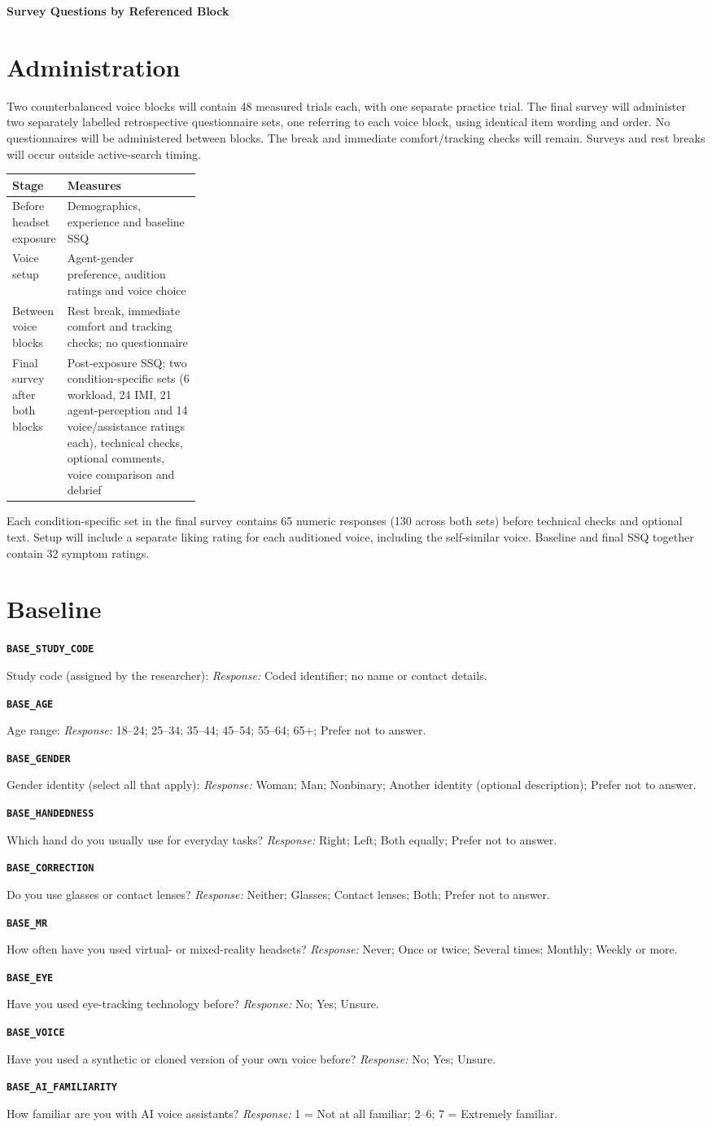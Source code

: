 \documentclass[11pt,letterpaper]{article}
\newcommand{\qid}[1]{\par\smallskip\textbf{\texttt{#1}}\par}
\begin{document}
{\LARGE\bfseries Survey Questions by Referenced Block}\par
\section{Administration}
Two counterbalanced voice blocks will contain 48 measured trials each, with one separate practice trial. The final survey will administer two separately labelled retrospective questionnaire sets, one referring to each voice block, using identical item wording and order. No questionnaires will be administered between blocks. The break and immediate comfort/tracking checks will remain. Surveys and rest breaks will occur outside active-search timing.

\begin{tabularx}{\linewidth}{@{}p{0.27\linewidth}X@{}}\toprule
Stage & Measures \\\midrule
Before headset exposure & Demographics, experience and baseline SSQ \\
Voice setup & Agent-gender preference, audition ratings and voice choice \\
Between voice blocks & Rest break, immediate comfort and tracking checks; no questionnaire \\
Final survey after both blocks & Post-exposure SSQ; two condition-specific sets (6 workload, 24 IMI, 21 agent-perception and 14 voice/assistance ratings each), technical checks, optional comments, voice comparison and debrief \\\bottomrule
\end{tabularx}
Each condition-specific set in the final survey contains 65 numeric responses (130 across both sets) before technical checks and optional text. Setup will include a separate liking rating for each auditioned voice, including the self-similar voice. Baseline and final SSQ together contain 32 symptom ratings.

\section{Baseline}
\qid{BASE\_STUDY\_CODE}
Study code (assigned by the researcher):
\textit{Response:} Coded identifier; no name or contact details.
\qid{BASE\_AGE}
Age range:
\textit{Response:} 18--24; 25--34; 35--44; 45--54; 55--64; 65+; Prefer not to answer.
\qid{BASE\_GENDER}
Gender identity (select all that apply):
\textit{Response:} Woman; Man; Nonbinary; Another identity (optional description); Prefer not to answer.
\qid{BASE\_HANDEDNESS}
Which hand do you usually use for everyday tasks?
\textit{Response:} Right; Left; Both equally; Prefer not to answer.
\qid{BASE\_CORRECTION}
Do you use glasses or contact lenses?
\textit{Response:} Neither; Glasses; Contact lenses; Both; Prefer not to answer.
\qid{BASE\_MR}
How often have you used virtual- or mixed-reality headsets?
\textit{Response:} Never; Once or twice; Several times; Monthly; Weekly or more.
\qid{BASE\_EYE}
Have you used eye-tracking technology before?
\textit{Response:} No; Yes; Unsure.
\qid{BASE\_VOICE}
Have you used a synthetic or cloned version of your own voice before?
\textit{Response:} No; Yes; Unsure.
\qid{BASE\_AI\_FAMILIARITY}
How familiar are you with AI voice assistants?
\textit{Response:} 1 = Not at all familiar; 2--6; 7 = Extremely familiar.
\end{document}
